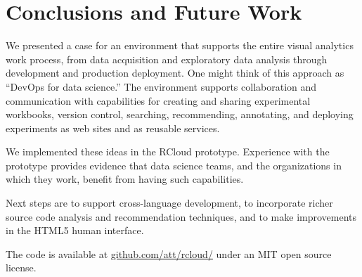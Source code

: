\section{Conclusions and Future Work}

We presented a case for an environment that supports the entire
visual analytics work process, from data acquisition and exploratory
data analysis through development and production deployment. One might
think of this approach as ``DevOps for data science.'' The environment
supports collaboration and communication with capabilities for
creating and sharing experimental workbooks, version control,
searching, recommending, annotating, and deploying experiments
as web sites and as reusable services.

We implemented these ideas in the RCloud prototype.
Experience with the prototype provides evidence that data
science teams, and the organizations in which they work,
benefit from having such capabilities.

Next steps are to support cross-language development, to incorporate
richer source code analysis and recommendation techniques, and
to make improvements in the HTML5 human interface.

The code is available 
at \url{github.com/att/rcloud/}
under an MIT open source license.
